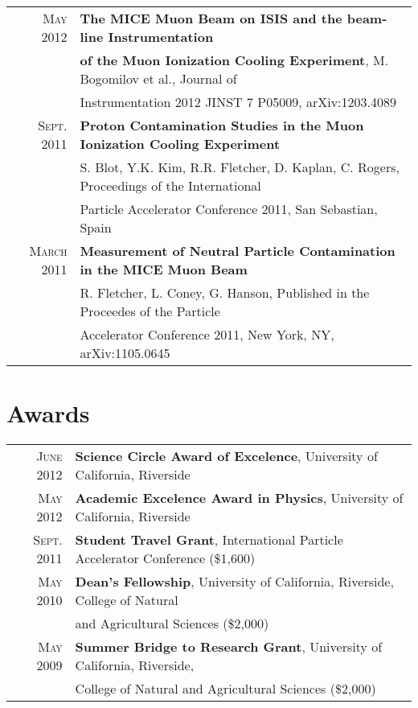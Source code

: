 \documentclass[a4paper,10pt]{article} %
\begin{document}
\begin{tabular}{rl}
\textsc{May} 2012  & \textbf{The MICE Muon Beam on ISIS and the beam-line Instrumentation} \\
                   & \textbf{of the Muon Ionization Cooling Experiment}, M. Bogomilov et al., Journal of \\
				   & Instrumentation 2012 JINST 7 P05009, arXiv:1203.4089 \\
\textsc{Sept.} 2011 & \textbf{Proton Contamination Studies in the Muon Ionization Cooling Experiment} \\
					& S. Blot, Y.K. Kim, R.R. Fletcher, D. Kaplan, C. Rogers, Proceedings of the International \\
					& Particle Accelerator Conference 2011, San Sebastian, Spain \\
\textsc{March} 2011 & \textbf{Measurement of Neutral Particle Contamination in the MICE Muon Beam}\\
					& R. Fletcher, L. Coney, G. Hanson, Published in the Proceedes of the Particle \\
                    & Accelerator Conference 2011, New York, NY, arXiv:1105.0645\\

\end{tabular}


\section{Awards}

\begin{tabular}{rl}
\textsc{June} 2012  & \textbf{Science Circle Award of Excelence}, University of California, Riverside \\
\textsc{May} 2012   & \textbf{Academic Excelence Award in Physics}, University of California, Riverside \\
\textsc{Sept.} 2011 & \textbf{Student Travel Grant}, International Particle Accelerator Conference \footnotesize(\$1,600)\normalsize\\
\textsc{May} 2010   & \textbf{Dean's Fellowship}, University of California, Riverside, College of Natural\\
				    & and Agricultural Sciences \footnotesize(\$2,000)\normalsize\\
\textsc{May} 2009   & \textbf{Summer Bridge to Research Grant}, University of California, Riverside, \\
			        & College of Natural and Agricultural Sciences \footnotesize(\$2,000)\normalsize\\

\end{tabular}
\end{document}
